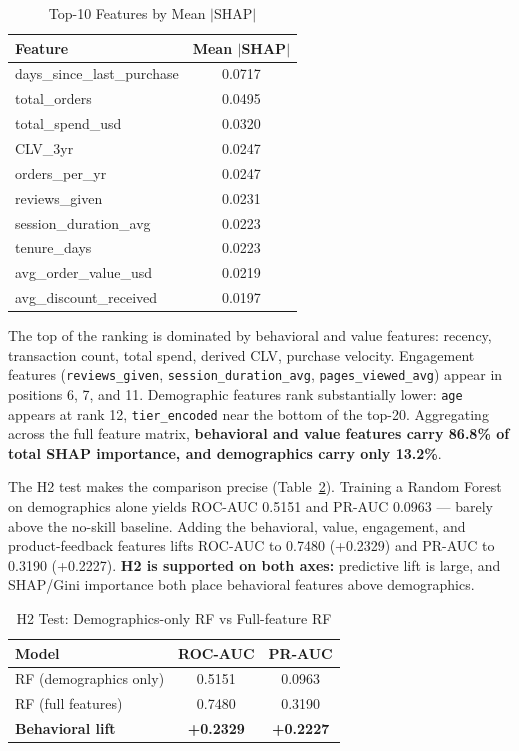 \documentclass[conference]{IEEEtran}
\begin{document}
\begin{table}[h]
\caption{Top-10 Features by Mean $|$SHAP$|$}
\label{tab:shap}
\centering
\renewcommand{\arraystretch}{1.2}
\begin{tabular}{l c}
\toprule
\textbf{Feature} & \textbf{Mean $|$SHAP$|$} \\
\midrule
days\_since\_last\_purchase & 0.0717 \\
total\_orders               & 0.0495 \\
total\_spend\_usd           & 0.0320 \\
CLV\_3yr                    & 0.0247 \\
orders\_per\_yr             & 0.0247 \\
reviews\_given              & 0.0231 \\
session\_duration\_avg      & 0.0223 \\
tenure\_days                & 0.0223 \\
avg\_order\_value\_usd      & 0.0219 \\
avg\_discount\_received     & 0.0197 \\
\bottomrule
\end{tabular}
\end{table}

The top of the ranking is dominated by behavioral and value features: recency, transaction count, total spend, derived CLV, purchase velocity. Engagement features (\texttt{reviews\_given}, \texttt{session\_duration\_avg}, \texttt{pages\_viewed\_avg}) appear in positions 6, 7, and 11. Demographic features rank substantially lower: \texttt{age} appears at rank 12, \texttt{tier\_encoded} near the bottom of the top-20. Aggregating across the full feature matrix, \textbf{behavioral and value features carry 86.8\% of total SHAP importance, and demographics carry only 13.2\%}.

The H2 test makes the comparison precise (Table~\ref{tab:h2_lift}). Training a Random Forest on demographics alone yields ROC-AUC 0.5151 and PR-AUC 0.0963 — barely above the no-skill baseline. Adding the behavioral, value, engagement, and product-feedback features lifts ROC-AUC to 0.7480 (+0.2329) and PR-AUC to 0.3190 (+0.2227). \textbf{H2 is supported on both axes:} predictive lift is large, and SHAP/Gini importance both place behavioral features above demographics.

\begin{table}[h]
\caption{H2 Test: Demographics-only RF vs Full-feature RF}
\label{tab:h2_lift}
\centering
\renewcommand{\arraystretch}{1.2}
\begin{tabular}{l c c}
\toprule
\textbf{Model} & \textbf{ROC-AUC} & \textbf{PR-AUC} \\
\midrule
RF (demographics only) & 0.5151 & 0.0963 \\
RF (full features)     & 0.7480 & 0.3190 \\
\midrule
\textbf{Behavioral lift} & \textbf{+0.2329} & \textbf{+0.2227} \\
\bottomrule
\end{tabular}
\end{table}
\end{document}
